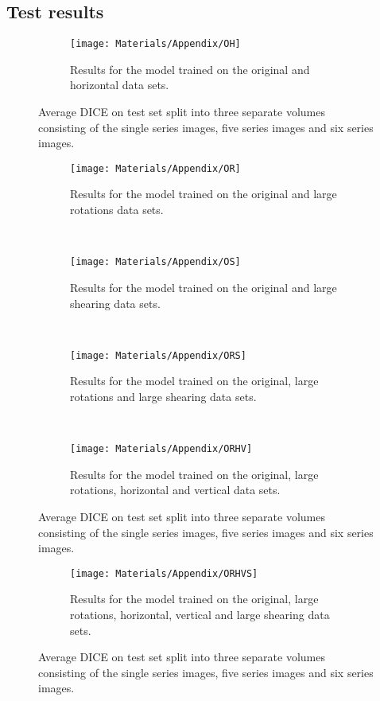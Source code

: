\subsection{Test results}
\begin{figure}[H]
	\centering
	\begin{subfigure}[b]{\linewidth}
		\centering
		\texttt{[image: Materials/Appendix/OH]}
		\caption{Results for the model trained on the original and horizontal data sets.}
	\end{subfigure}
	\caption{Average DICE on test set split into three separate volumes consisting of the single series images, five series images and six series images.}
\end{figure}
\begin{figure}[H]
	\centering
	\begin{subfigure}[b]{\linewidth}
		\centering
		\texttt{[image: Materials/Appendix/OR]}
		\caption{Results for the model trained on the original and large rotations data sets.}
	\end{subfigure}
	\\
	\begin{subfigure}[b]{\linewidth}
		\centering
		\texttt{[image: Materials/Appendix/OS]}
		\caption{Results for the model trained on the original and large shearing data sets.}
	\end{subfigure}
	\\
	\begin{subfigure}[b]{\linewidth}
		\centering
		\texttt{[image: Materials/Appendix/ORS]}
		\caption{Results for the model trained on the original, large rotations and large shearing data sets.}
	\end{subfigure}
	\\
	\begin{subfigure}[b]{\linewidth}
		\centering
		\texttt{[image: Materials/Appendix/ORHV]}
		\caption{Results for the model trained on the original, large rotations, horizontal and vertical data sets.}
	\end{subfigure}
	\caption{Average DICE on test set split into three separate volumes consisting of the single series images, five series images and six series images.}
\end{figure}
\begin{figure}[H]
	\centering
	\begin{subfigure}[b]{\linewidth}
		\centering
		\texttt{[image: Materials/Appendix/ORHVS]}
		\caption{Results for the model trained on the original, large rotations, horizontal, vertical and large shearing data sets.}
	\end{subfigure}
	\caption{Average DICE on test set split into three separate volumes consisting of the single series images, five series images and six series images.}
\end{figure}

